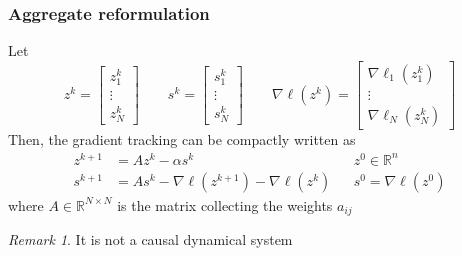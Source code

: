 \documentclass{book}
\newcommand{\R}{\mathbb{R}}
\theoremstyle{theoremv2}
\theoremstyle{defv2}
\theoremstyle{remark}
\newtheorem*{remark}{Remark}
\theoremstyle{remark}
\theoremstyle{definition}
\theoremstyle{definition}
\begin{document}
\subsubsection{Aggregate reformulation}
Let 
\[
    z^k = \begin{bmatrix}
        z_1^k \\ \vdots \\ z_N^k
    \end{bmatrix} \qquad s^k = \begin{bmatrix}
        s_1^k \\ \vdots \\ s_N^k
    \end{bmatrix} \qquad \nabla\boldsymbol{\ell}(z^k) = \begin{bmatrix}
        \nabla\ell_1(z_1^k) \\ \vdots \\ \nabla\ell_N(z_N^k)
    \end{bmatrix}
\]
Then, the gradient tracking can be compactly written as 
\begin{align*}
    z^{k+1} &= Az^k - \alpha s^k && z^0 \in \R^n \\
    s^{k+1} &= As^k - \nabla\boldsymbol{\ell}(z^{k+1}) - \nabla\boldsymbol{\ell}(z^{k}) && s^0  = \nabla\boldsymbol{\ell}(z^{0})
\end{align*}
where $A\in\R^{N\times N}$ is the matrix collecting the weights $a_{ij}$
\begin{remark}
    It is not a causal dynamical system
\end{remark}
\end{document}
